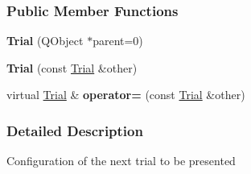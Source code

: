 \subsubsection*{Public Member Functions}
\begin{DoxyCompactItemize}
\item
\hypertarget{classapex_1_1data_1_1_trial_a6608023589e9c08304173165b95c578d}{{\bfseries Trial} (Q\-Object $\ast$parent=0)}\label{classapex_1_1data_1_1_trial_a6608023589e9c08304173165b95c578d}

\item
\hypertarget{classapex_1_1data_1_1_trial_a8d2febf45a6ec9f527bc96a835f6b52f}{{\bfseries Trial} (const \hyperlink{classapex_1_1data_1_1_trial}{Trial} \&other)}\label{classapex_1_1data_1_1_trial_a8d2febf45a6ec9f527bc96a835f6b52f}

\item
\hypertarget{classapex_1_1data_1_1_trial_ae5ec9d39d50b4d5a470def04afd8695e}{virtual \hyperlink{classapex_1_1data_1_1_trial}{Trial} \& {\bfseries operator=} (const \hyperlink{classapex_1_1data_1_1_trial}{Trial} \&other)}\label{classapex_1_1data_1_1_trial_ae5ec9d39d50b4d5a470def04afd8695e}

\end{DoxyCompactItemize}


\subsubsection{Detailed Description}
Configuration of the next trial to be presented

